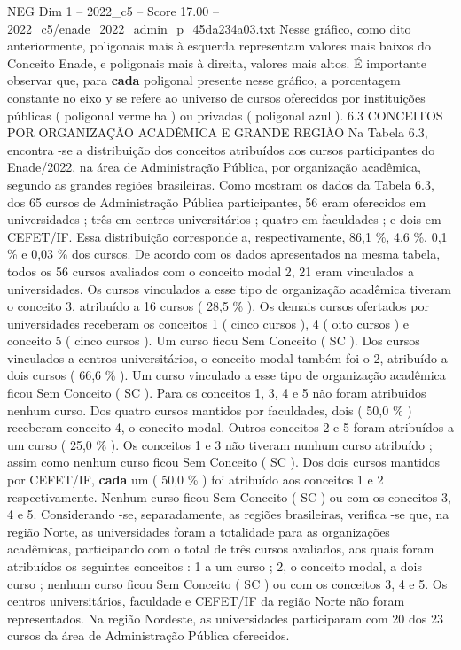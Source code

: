 \begin{textsample}{NEG Dim 1 – 2022\_c5 – Score 17.00 – 2022\_c5/enade\_2022\_admin\_p\_45da234a03.txt}
Nesse gráfico, como dito anteriormente, poligonais mais à esquerda representam valores mais baixos do Conceito Enade, e poligonais mais à direita, valores mais altos.
É importante observar que, para \textbf{cada} poligonal presente nesse gráfico, a porcentagem constante no eixo y se refere ao universo de cursos oferecidos por instituições públicas ( poligonal vermelha ) ou privadas ( poligonal azul ). 6.3 CONCEITOS POR ORGANIZAÇÃO ACADÊMICA E GRANDE REGIÃO Na Tabela 6.3, encontra -se a distribuição dos conceitos atribuídos aos cursos participantes do Enade/2022, na área de Administração Pública, por organização acadêmica, segundo as grandes regiões brasileiras.
Como mostram os dados da Tabela 6.3, dos 65 cursos de Administração Pública participantes, 56 eram oferecidos em universidades ; três em centros universitários ; quatro em faculdades ; e dois em CEFET/IF.
Essa distribuição corresponde a, respectivamente, 86,1 \%, 4,6 \%, 0,1 \% e 0,03 \% dos cursos.
De acordo com os dados apresentados na mesma tabela, todos os 56 cursos avaliados com o conceito modal 2, 21 eram vinculados a universidades.
Os cursos vinculados a esse tipo de organização acadêmica tiveram o conceito 3, atribuído a 16 cursos ( 28,5 \% ).
Os demais cursos ofertados por universidades receberam os conceitos 1 ( cinco cursos ), 4 ( oito cursos ) e conceito 5 ( cinco cursos ).
Um curso ficou Sem Conceito ( SC ).
Dos cursos vinculados a centros universitários, o conceito modal também foi o 2, atribuído a dois cursos ( 66,6 \% ).
Um curso vinculado a esse tipo de organização acadêmica ficou Sem Conceito ( SC ).
Para os conceitos 1, 3, 4 e 5 não foram atribuidos nenhum curso.
Dos quatro cursos mantidos por faculdades, dois ( 50,0 \% ) receberam conceito 4, o conceito modal.
Outros conceitos 2 e 5 foram atribuídos a um curso ( 25,0 \% ).
Os conceitos 1 e 3 não tiveram nunhum curso atribuído ; assim como nenhum curso ficou Sem Conceito ( SC ).
Dos dois cursos mantidos por CEFET/IF, \textbf{cada} um ( 50,0 \% ) foi atribuído aos conceitos 1 e 2 respectivamente.
Nenhum curso ficou Sem Conceito ( SC ) ou com os conceitos 3, 4 e 5.
Considerando -se, separadamente, as regiões brasileiras, verifica -se que, na região Norte, as universidades foram a totalidade para as organizações acadêmicas, participando com o total de três cursos avaliados, aos quais foram atribuídos os seguintes conceitos : 1 a um curso ; 2, o conceito modal, a dois curso ; nenhum curso ficou Sem Conceito ( SC ) ou com os conceitos 3, 4 e 5.
Os centros universitários, faculdade e CEFET/IF da região Norte não foram representados.
Na região Nordeste, as universidades participaram com 20 dos 23 cursos da área de Administração Pública oferecidos.

\end{textsample}
